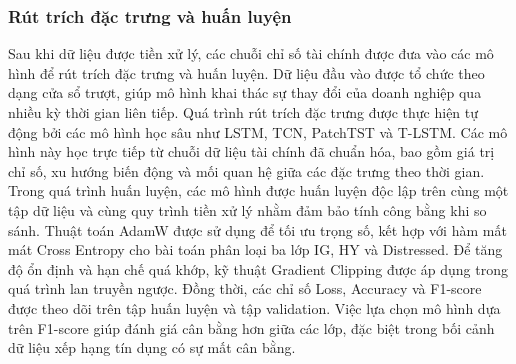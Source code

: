 \documentclass[10pt,twoside]{article}
\begin{document}
\subsubsection{Rút trích đặc trưng và huấn luyện}
Sau khi dữ liệu được tiền xử lý, các chuỗi chỉ số tài chính được đưa vào các mô hình để rút trích đặc trưng và huấn luyện. Dữ liệu đầu vào được tổ chức theo dạng cửa sổ trượt, giúp mô hình khai thác sự thay đổi của doanh nghiệp qua nhiều kỳ thời gian liên tiếp. Quá trình rút trích đặc trưng được thực hiện tự động bởi các mô hình học sâu như LSTM, TCN, PatchTST và T-LSTM. Các mô hình này học trực tiếp từ chuỗi dữ liệu tài chính đã chuẩn hóa, bao gồm giá trị chỉ số, xu hướng biến động và mối quan hệ giữa các đặc trưng theo thời gian. Trong quá trình huấn luyện, các mô hình được huấn luyện độc lập trên cùng một tập dữ liệu và cùng quy trình tiền xử lý nhằm đảm bảo tính công bằng khi so sánh. Thuật toán AdamW được sử dụng để tối ưu trọng số, kết hợp với hàm mất mát Cross Entropy cho bài toán phân loại ba lớp IG, HY và Distressed. Để tăng độ ổn định và hạn chế quá khớp, kỹ thuật Gradient Clipping được áp dụng trong quá trình lan truyền ngược. Đồng thời, các chỉ số Loss, Accuracy và F1-score được theo dõi trên tập huấn luyện và tập validation. Việc lựa chọn mô hình dựa trên F1-score giúp đánh giá cân bằng hơn giữa các lớp, đặc biệt trong bối cảnh dữ liệu xếp hạng tín dụng có sự mất cân bằng.
\end{document}
